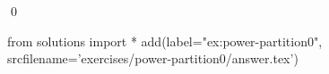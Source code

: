 
\begin{ex} 
  \label{ex:power-partition0}
  
  \qed
\end{ex} 
\begin{python0}
from solutions import *
add(label="ex:power-partition0",
    srcfilename='exercises/power-partition0/answer.tex') 
\end{python0}
